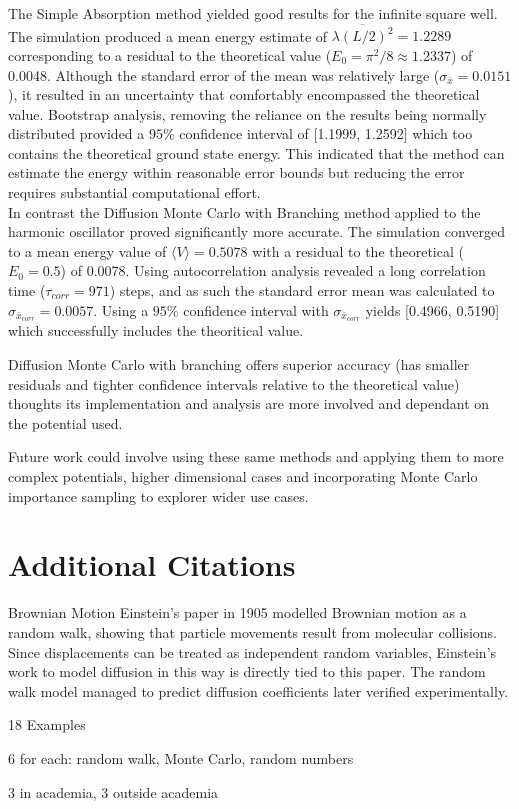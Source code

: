 \documentclass[reqno]{amsart}
\makeatletter
\renewcommand\subsection{\@startsection{subsection}{2}%
  \z@{.5\linespacing\@plus.7\linespacing}{-.5em}%
  {\normalfont\scshape\justify}}
\numberwithin{equation}{section}
\numberwithin{figure}{section}
\makeatother
\begin{document}
The Simple Absorption method yielded good results for the infinite square well. The simulation produced a mean energy estimate of $\overline{\lambda (L/2)^2} = 1.2289$ corresponding to a residual to the theoretical value ($E_0 = \pi^2/8 \approx 1.2337$) of 0.0048. Although the standard error of the mean was relatively large ($\sigma_{\bar{x}} = 0.0151$), it resulted in an uncertainty that comfortably encompassed the theoretical value. Bootstrap analysis, removing the reliance on the results being normally distributed provided a $95\%$ confidence interval of [1.1999, 1.2592] which too contains the theoretical ground state energy. This indicated that the method can estimate the energy within reasonable error bounds but reducing the error requires substantial computational effort. \\

In contrast the Diffusion Monte Carlo with Branching method applied to the harmonic oscillator proved significantly more accurate. The simulation converged to a mean energy value of $\langle V \rangle = 0.5078$ with a residual to the theoretical ($E_0 = 0.5$) of 0.0078. Using autocorrelation analysis revealed a long correlation time ($\tau_{corr} = 971$) steps, and as such the standard error mean was calculated to $\sigma_{\bar{x}_{corr}} = 0.0057$. Using a $95\%$ confidence interval with $\sigma_{\bar{x}_{corr}}$ yields [0.4966, 0.5190] which successfully includes the theoritical value.

Diffusion Monte Carlo with branching offers superior accuracy (has smaller residuals and tighter confidence intervals relative to the theoretical value) thoughts its implementation and analysis are more involved and dependant on the potential used.

Future work could involve using these same methods and applying them to more complex potentials, higher dimensional cases and incorporating Monte Carlo importance sampling to explorer wider use cases.

\appendix
\section{Additional Citations}
\subsection{Brownian Motion}
Einstein's paper in 1905 \cite{einstein1905} modelled Brownian motion as a random walk, showing that particle movements result from molecular collisions. Since displacements can be treated as independent random variables, Einstein's work to model diffusion in this way is directly tied to this paper. The random walk model managed to predict diffusion coefficients later verified experimentally.

18 Examples

6 for each: random walk, Monte Carlo, random numbers

3 in academia, 3 outside academia



\end{document}
